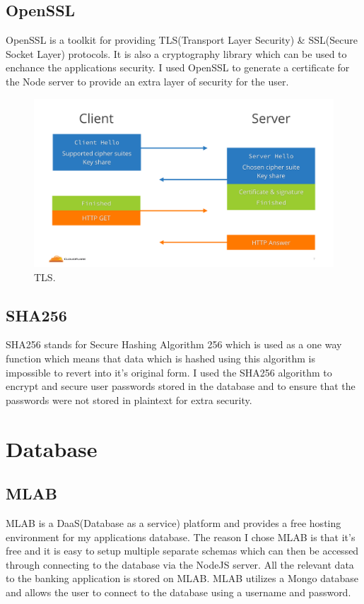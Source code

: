 \subsection{OpenSSL}
OpenSSL is a toolkit for providing TLS(Transport Layer Security) \& SSL(Secure Socket Layer) protocols.  It is also a cryptography library which can be used to enchance the applications security.  I used OpenSSL to generate a certificate for the Node server to provide an extra layer of security for the user.
\\
\begin{figure}[h!]
  \includegraphics[width=\textwidth]{img/tls.png}
  \caption{TLS.}
  \label{fig: How TLS Works}
\end{figure}
\cite{TLS}
\subsection{SHA256}
SHA256 stands for Secure Hashing Algorithm 256 which is used as a one way function which means that data which is hashed using this algorithm is impossible to revert into it's original form\cite{SHA256}.  I used the SHA256 algorithm to encrypt and secure user passwords stored in the database and to ensure that the passwords were not stored in plaintext for extra security.
\section{Database}
\subsection{MLAB}
MLAB is a DaaS(Database as a service) platform and provides a free hosting environment for my applications database\cite{MLAB}.  The reason I chose MLAB is that it's free and it is easy to setup multiple separate schemas which can then be accessed through connecting to the database via the NodeJS server.  All the relevant data to the banking application is stored on MLAB.  MLAB utilizes a Mongo database and allows the user to connect to the database using a username and password.
